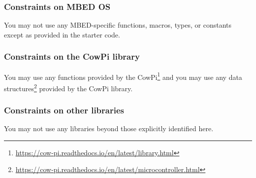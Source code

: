 \subsubsection{Constraints on MBED OS}

You may not use any MBED-specific functions, macros, types, or constants except as provided in the starter code.

\subsubsection{Constraints on the CowPi library}

You may use any functions provided by the CowPi\footnote{
    \url{https://cow-pi.readthedocs.io/en/latest/library.html}
}
and you may use any data structures\footnote{
    \url{https://cow-pi.readthedocs.io/en/latest/microcontroller.html}
} provided by the CowPi library.


\subsubsection{Constraints on other libraries}

You may not use any libraries beyond those explicitly identified here.